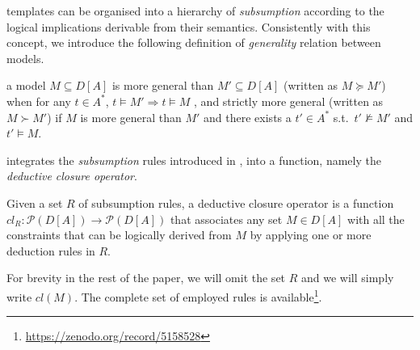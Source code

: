 \declare templates can be organised into a hierarchy of \emph{subsumption} \cite{2017-DiCiccio} according to the logical implications derivable from their semantics. Consistently with this concept, we introduce the following definition of \emph{generality} relation between models.
\begin{definition}{}\label{def:subs}
a model $M\subseteq D[A]$ is more general than $M'\subseteq D[A]$ (written as $M \succeq M'$) when for any $t\in A^*$, $t\models M' \Rightarrow t\models M$ , and strictly more general (written as $M \succ M'$) if $M$ is more general than $M'$ and there exists a $t'\in A^*$ s.t.\ $t'\not\models M'$ and $t'\models M$.
\end{definition}

\nd integrates the \emph{subsumption} rules introduced in \cite{2017-DiCiccio}, into a function, namely the \emph{deductive closure operator}.

\begin{definition}{}
Given a set $R$ of subsumption rules, a deductive closure operator is a function $cl_R: \mathcal{P}(D[A])\rightarrow\mathcal{P}(D[A])$ that associates any set $M \in D[A]$ with all the constraints that can be logically derived from $M$ by applying one or more deduction rules in $R$.
\end{definition}
For brevity in the rest of the paper, we will omit the set $R$ and we will simply write $cl(M)$. The complete set of employed rules is available\footnote{\url{https://zenodo.org/record/5158528}}.




